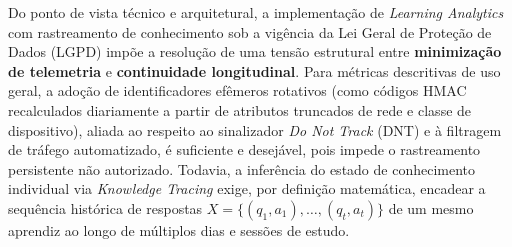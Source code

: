 Do ponto de vista técnico e arquitetural, a implementação de \textit{Learning Analytics} com rastreamento de conhecimento sob a vigência da Lei Geral de Proteção de Dados (LGPD) impõe a resolução de uma tensão estrutural entre \textbf{minimização de telemetria} e \textbf{continuidade longitudinal}. Para métricas descritivas de uso geral, a adoção de identificadores efêmeros rotativos (como códigos HMAC recalculados diariamente a partir de atributos truncados de rede e classe de dispositivo), aliada ao respeito ao sinalizador \textit{Do Not Track} (DNT) e à filtragem de tráfego automatizado, é suficiente e desejável, pois impede o rastreamento persistente não autorizado. Todavia, a inferência do estado de conhecimento individual via \textit{Knowledge Tracing} exige, por definição matemática, encadear a sequência histórica de respostas $X = \{(q_1, a_1), \ldots, (q_t, a_t)\}$ de um mesmo aprendiz ao longo de múltiplos dias e sessões de estudo.

